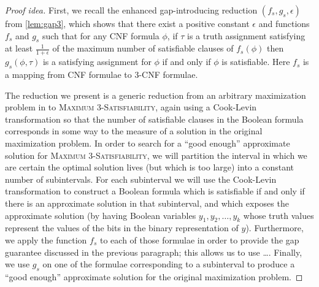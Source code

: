 \documentclass[]{article}
\theoremstyle{plain}
\theoremstyle{definition}
\newenvironment{proofidea}{\begin{proof}[Proof idea]}{\end{proof}}
\begin{document}
\begin{proofidea}
  First, we recall the enhanced gap-introducing reduction $(f_s, g_s, \epsilon)$ from \autoref{lem:gap3}, which shows that there exist a positive constant $\epsilon$ and functions $f_s$ and $g_s$ such that for any CNF formula $\phi$, if $\tau$ is a truth assignment satisfying at least $\frac{1}{1 + \epsilon}$ of the maximum number of satisfiable clauses of $f_s(\phi)$ then $g_s(\phi, \tau)$ is a satisfying assignment for $\phi$ if and only if $\phi$ is satisfiable.
  Here $f_s$ is a mapping from CNF formulae to 3-CNF formulae.

  The reduction we present is a generic reduction from an arbitrary maximization problem in \APX{} to \textsc{Maximum 3-Satisfiability}, again using a Cook-Levin transformation so that the number of satisfiable clauses in the Boolean formula corresponds in some way to the measure of a solution in the original maximization problem.
  In order to search for a ``good enough'' approximate solution for \textsc{Maximum 3-Satisfiability}, we will partition the interval in which we are certain the optimal solution lives (but which is too large) into a constant number of subintervals.
  For each subinterval we will use the Cook-Levin transformation to construct a Boolean formula which is satisfiable if and only if there is an approximate solution in that subinterval, and which exposes the approximate solution (by having Boolean variables $y_1, y_2, \dotsc, y_k$ whose truth values represent the values of the bits in the binary representation of $y$).
  Furthermore, we apply the function $f_s$ to each of those formulae in order to provide the gap guarantee discussed in the previous paragraph; this allows us to use \ldots.
  Finally, we use $g_s$ on one of the formulae corresponding to a subinterval to produce a ``good enough'' approximate solution for the original maximization problem.
\end{proofidea}
\end{document}
